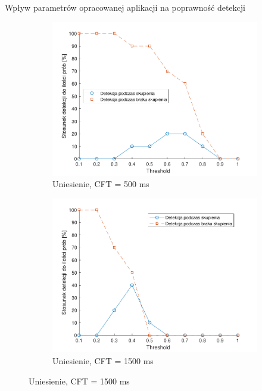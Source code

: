 \documentclass[10pt,aspectratio=169]{beamer}
\begin{document}
\begin{frame}{Wpływ parametrów opracowanej aplikacji na poprawność detekcji}
  \begin{figure}[htb]
    \centering
    \begin{subfigure}{0.3\linewidth}
    \includegraphics[width=\linewidth,keepaspectratio]{obrazy/up500}
    \caption{Uniesienie, CFT = 500 ms}
    \end{subfigure}\hspace*{\fill}
    \begin{subfigure}{0.3\linewidth}
    \includegraphics[width=\linewidth,keepaspectratio]{obrazy/up1500}
    \caption{Uniesienie, CFT = 1500 ms}
    \end{subfigure}\hspace*{\fill}

\end{figure}
\end{frame}
\end{document}
